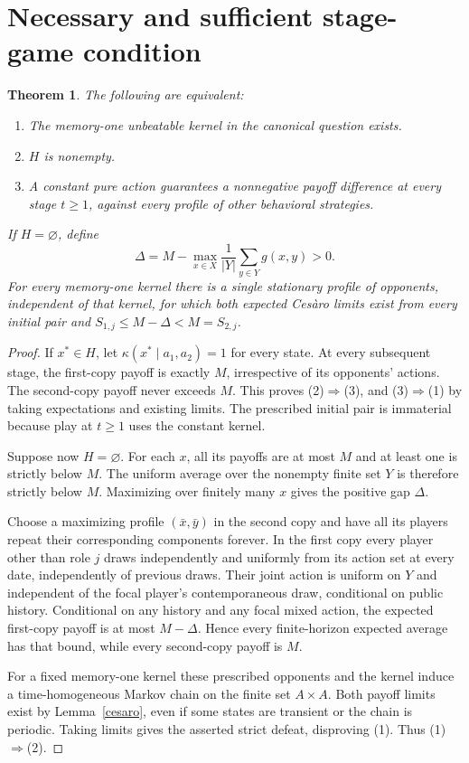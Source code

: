 \documentclass[11pt]{article}
\newtheorem{theorem}{Theorem}
\theoremstyle{remark}
\begin{document}
\section{Necessary and sufficient stage-game condition}
\begin{theorem}\label{main}
The following are equivalent:
\begin{enumerate}
\item The memory-one unbeatable kernel in the canonical question exists.
\item $H$ is nonempty.
\item A constant pure action guarantees a nonnegative payoff difference at every stage $t\geq1$, against every profile of other behavioral strategies.
\end{enumerate}
If $H=\varnothing$, define
\[
 \Delta=M-\max_{x\in X}\frac1{|Y|}\sum_{y\in Y}g(x,y)>0.
\]
For every memory-one kernel there is a single stationary profile of opponents, independent of that kernel, for which both expected Ces\`aro limits exist from every initial pair and
$S_{1,j}\leq M-\Delta<M=S_{2,j}$.
\end{theorem}
\begin{proof}
If $x^*\in H$, let $\kappa(x^*\mid a_1,a_2)=1$ for every state. At every subsequent stage, the first-copy payoff is exactly $M$, irrespective of its opponents' actions. The second-copy payoff never exceeds $M$. This proves (2)$\Rightarrow$(3), and (3)$\Rightarrow$(1) by taking expectations and existing limits. The prescribed initial pair is immaterial because play at $t\geq1$ uses the constant kernel.

Suppose now $H=\varnothing$. For each $x$, all its payoffs are at most $M$ and at least one is strictly below $M$. The uniform average over the nonempty finite set $Y$ is therefore strictly below $M$. Maximizing over finitely many $x$ gives the positive gap $\Delta$.

Choose a maximizing profile $(\bar x,\bar y)$ in the second copy and have all its players repeat their corresponding components forever. In the first copy every player other than role $j$ draws independently and uniformly from its action set at every date, independently of previous draws. Their joint action is uniform on $Y$ and independent of the focal player's contemporaneous draw, conditional on public history. Conditional on any history and any focal mixed action, the expected first-copy payoff is at most $M-\Delta$. Hence every finite-horizon expected average has that bound, while every second-copy payoff is $M$.

For a fixed memory-one kernel these prescribed opponents and the kernel induce a time-homogeneous Markov chain on the finite set $A\times A$. Both payoff limits exist by Lemma~\ref{cesaro}, even if some states are transient or the chain is periodic. Taking limits gives the asserted strict defeat, disproving (1). Thus (1)$\Rightarrow$(2).
\end{proof}
\end{document}
